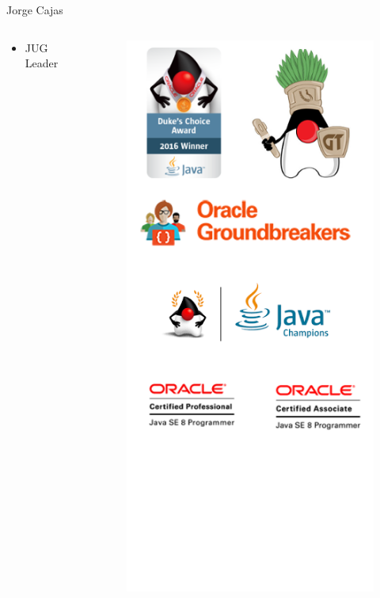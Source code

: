 \documentclass{beamer}
\begin{document}
\begin{frame}{Jorge Cajas}
\begin{columns}[T] %
	\begin{column}[T]{5cm} %
		\begin{itemize}
			\item JUG Leader
		\end{itemize}
	\end{column}
	\begin{column}[T]{5cm} %
		\begin{figure}
			\centering
			\includegraphics[width=0.6\linewidth]{Images/logos}
		\end{figure}
		
	\end{column}
\end{columns}
\end{frame}
\end{document}
